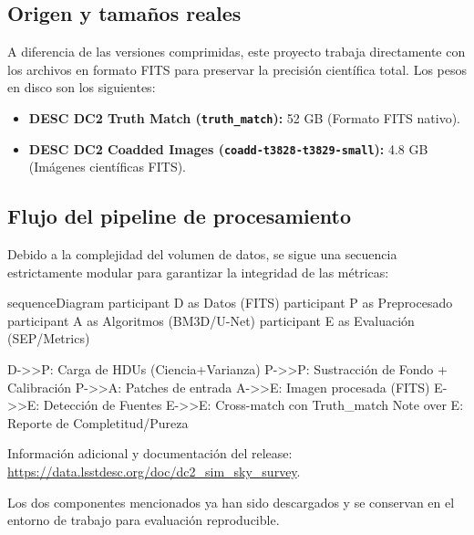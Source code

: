 \subsection{Origen y tama\~nos reales}

A diferencia de las versiones comprimidas, este proyecto trabaja directamente con los archivos en formato FITS para preservar la precisi\'on cient\'ifica total. Los pesos en disco son los siguientes:

\begin{itemize}
  \item \textbf{DESC DC2 Truth Match (\texttt{truth\_match}):} 52 GB (Formato FITS nativo).
  \item \textbf{DESC DC2 Coadded Images (\texttt{coadd-t3828-t3829-small}):} 4.8 GB (Im\'agenes cient\'ificas FITS).
\end{itemize}

\bigskip

\subsection{Flujo del pipeline de procesamiento}

Debido a la complejidad del volumen de datos, se sigue una secuencia estrictamente modular para garantizar la integridad de las m\'etricas:

\begin{mermaid}[width=0.9\linewidth, caption={Secuencia de procesamiento desde datos crudos hasta m\'etricas}, pos=t]
sequenceDiagram
    participant D as Datos (FITS)
    participant P as Preprocesado
    participant A as Algoritmos (BM3D/U-Net)
    participant E as Evaluación (SEP/Metrics)

    D->>P: Carga de HDUs (Ciencia+Varianza)
    P->>P: Sustracción de Fondo + Calibración
    P->>A: Patches de entrada
    A->>E: Imagen procesada (FITS)
    E->>E: Detección de Fuentes
    E->>E: Cross-match con Truth_match
    Note over E: Reporte de Completitud/Pureza
\end{mermaid}

\bigskip

Informaci\'on adicional y documentaci\'on del release: \url{https://data.lsstdesc.org/doc/dc2_sim_sky_survey}.

\bigskip

Los dos componentes mencionados ya han sido descargados y se conservan en el entorno de trabajo para evaluaci\'on reproducible.

